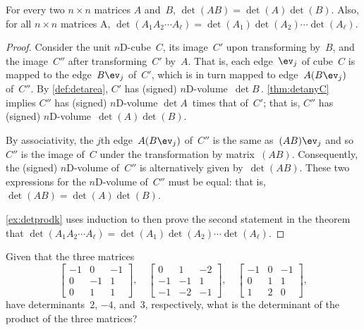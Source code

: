 \begin{theorem} \label{thm:detprod} 
For every two \(n\times n\) matrices \(A\) and~\(B\), \(\det(AB)=\det(A)\det(B)\).
Also, for all \(n\times n\) matrices \hlist A\ell, \(\det(A_1A_2\cdots A_\ell)=\det(A_1)\det(A_2)\cdots\det(A_\ell)\).
\end{theorem}


\begin{proof}  
Consider the unit $n$D-cube~\(C\),  its image~\(C'\) upon transforming by~\(B\), and the image~\(C''\) after transforming~\(C'\) by~\(A\). 
That is, each edge~\(\ev_j\) of cube~\(C\) is mapped to the edge~\(B\ev_j\) of~\(C'\), which is in turn mapped to edge~\(A(B\ev_j)\) of~\(C''\). 
By \cref{def:detarea}, \(C'\) has (signed) $n$D-volume~\(\det B\)\,.
\cref{thm:detanyC} implies \(C''\) has (signed) $n$D-volume \(\det A\)~times that of~\(C'\); that is, \(C''\) has (signed) $n$D-volume~\(\det(A)\det(B)\).  

By associativity, the \(j\)th edge~\(A(B\ev_j)\) of~\(C''\) is the same as~\((AB)\ev_j\) and so \(C''\) is the image of~\(C\) under the transformation by matrix~\((AB)\).
Consequently, the (signed) $n$D-volume of~\(C''\) is alternatively given by~\(\det(AB)\).
These two expressions for the $n$D-volume of~\(C''\) must be equal: that is, \(\det(AB)=\det(A)\det(B)\).

\cref{ex:detprodk} uses induction to then prove the second statement in the theorem that \(\det(A_1A_2\cdots A_\ell)=\det(A_1)\det(A_2)\cdots\det(A_\ell)\).
\end{proof}



\begin{activity}
Given that the three matrices
\begin{equation*}
\begin{bmatrix} -1&0&-1
\\0&-1&1
\\0&1&1 \end{bmatrix},\quad
\begin{bmatrix} 0&1&-2
\\-1&-1&1
\\-1&-2&-1 \end{bmatrix},\quad
\begin{bmatrix} -1&0&-1
\\0&1&1
\\1&2&0 \end{bmatrix},
\end{equation*}
have determinants~\(2\), \(-4\), and~\(3\), respectively, what is the determinant of the product of the three matrices?
\end{activity}




